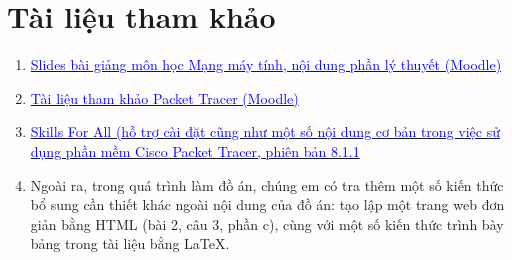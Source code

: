 \documentclass[a4paper]{article}
\author{Nguyễn Văn Lộc}
\begin{document}
\fancyhf{}
\chead{}
\lfoot{}
\cfoot{\thepage}
\rfoot{}
\pagestyle{fancy}
\renewcommand{\headrulewidth}{0pt}
\renewcommand{\footrulewidth}{0pt}

\tableofcontents
\listoffigures
\listoftables
\newpage



\newpage
\nocite{gt}

\newpage
\section{Tài liệu tham khảo}
\sf 
\begin{enumerate}
\item \href{https://courses.fit.hcmus.edu.vn/mod/folder/view.php?id=90049}{\textcolor{blue}{Slides bài giảng môn học Mạng máy tính, nội dung phần lý thuyết (Moodle)}}

\item \href{https://drive.google.com/file/d/1g05MJB54c89EOIFp4v2oLbVtdccsBMLU/view}{\textcolor{blue}{Tài liệu tham khảo Packet Tracer (Moodle)}}

\item \href{https://skillsforall.com}{\textcolor{blue}{Skills For All (hỗ trợ cài đặt cũng như một số nội dung cơ bản trong việc sử dụng phần mềm Cisco Packet Tracer, phiên bản 8.1.1}}

\item Ngoài ra, trong quá trình làm đồ án, chúng em có tra thêm một số kiến thức bổ sung cần thiết khác ngoài nội dung của đồ án: tạo lập một trang web đơn giản bằng HTML (bài 2, câu 3, phần c), cùng với một số kiến thức trình bày bảng trong tài liệu bằng LaTeX.
\end{enumerate}
\end{document}
